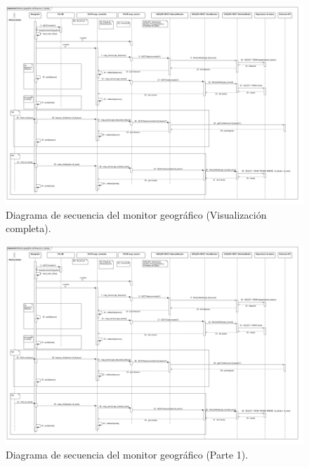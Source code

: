 \FloatBarrier
\begin{figure}[htbp!]
		\centering
			\includegraphics[width=1 \textwidth]{imagenes/DSRuben/MonitorGeografico}
		\caption{Diagrama de secuencia del monitor geográfico (Visualización completa).}
		\label{DS:MonitorGeografico}
\end{figure}
\FloatBarrier

\FloatBarrier
\begin{figure}[htbp!]
		\centering
			\includegraphics[width=1 \textwidth]{imagenes/DSRuben/MonitorGeografico_1}
		\caption{Diagrama de secuencia del monitor geográfico (Parte 1).}
		\label{DS:MonitorGeografico1}
\end{figure}
\FloatBarrier

